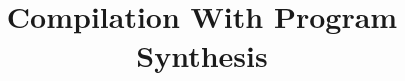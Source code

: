 \documentclass[acmsmall]{acmart}
\begin{document}
\title{Compilation With Program Synthesis}

%
%
%
%
%
%
%
%
\end{document}
